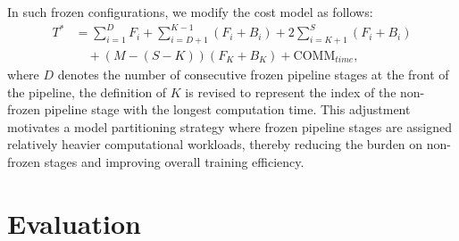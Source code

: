 \documentclass[conference]{IEEEtran}
\begin{document}
In such frozen configurations, we modify the cost model as follows:
\begin{equation}
\begin{split}
T^* &= \sum_{i = 1}^{D}{F_i} + \sum_{i = D+1}^{K - 1}({F_i+B_i})+2 \sum_{i=K+1}^S(F_i+B_i) \\
    &\quad + (M - (S - K))(F_K + B_K) + \text{COMM}_{time},
\end{split}
\end{equation}
where $D$ denotes the number of consecutive frozen pipeline stages at the front of the pipeline, the definition of $K$ is revised to represent the index of the non-frozen pipeline stage with the longest computation time.
This adjustment motivates a model partitioning strategy where frozen pipeline stages are assigned relatively heavier computational workloads, thereby reducing the burden on non-frozen stages and improving overall training efficiency.


\section{Evaluation}
    
    
\end{document}

